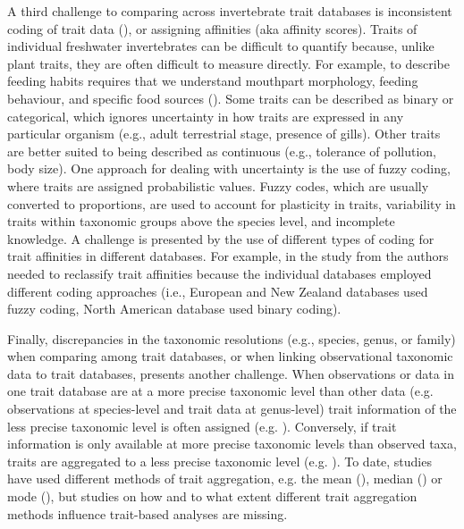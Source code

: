 \documentclass{article}
\begin{document}
A third challenge to comparing across invertebrate trait databases is inconsistent coding of trait data (\cite{culp_incorporating_2011}), or assigning affinities (aka affinity scores). Traits of individual freshwater invertebrates can be difficult to quantify because, unlike plant traits, they are often difficult to measure directly. For example, to describe feeding habits requires that we understand mouthpart morphology, feeding behaviour, and specific food sources (\cite{moog_comprehensive_nodate}). Some traits can be described as binary or categorical, which ignores uncertainty in how traits are expressed in any particular organism (e.g., adult terrestrial stage, presence of gills). Other traits are better suited to being described as continuous (e.g., tolerance of pollution, body size). One approach for dealing with uncertainty is the use of fuzzy coding, where traits are assigned probabilistic values. Fuzzy codes, which are usually converted to proportions, are used to account for plasticity in traits, variability in traits within taxonomic groups above the species level, and incomplete knowledge. A challenge is presented by the use of different types of coding for trait affinities in different databases. For example, in the study from \citet{brown_functional_2018} the authors needed to reclassify trait affinities because the individual databases employed different coding approaches (i.e., European and New Zealand databases used fuzzy coding, North American database used binary coding). 

Finally, discrepancies in the taxonomic resolutions (e.g., species, genus, or family) when comparing among trait databases, or when linking observational taxonomic data to trait databases, presents another challenge. When observations or data in one trait database are at a more precise taxonomic level than other data (e.g. observations at species-level and trait data at genus-level) trait information of the less precise taxonomic level is often assigned (e.g. \cite{szocs_effects_2014, vos_taxonomic_2017}). Conversely, if trait information is only available at more precise taxonomic levels than observed taxa, traits are aggregated to a less precise taxonomic level (e.g. \cite{aspin_extreme_2019, piliere_a._f._h._importance_2016, poff_functional_2006, szocs_effects_2014}). To date, studies have used different methods of trait aggregation, e.g. the mean (\cite{magliozzi_functional_2019}), median (\cite{szocs_effects_2014}) or mode (\cite{piliere_a._f._h._importance_2016}), but studies on how and to what extent different trait aggregation methods influence trait-based analyses are missing. 
\end{document}
